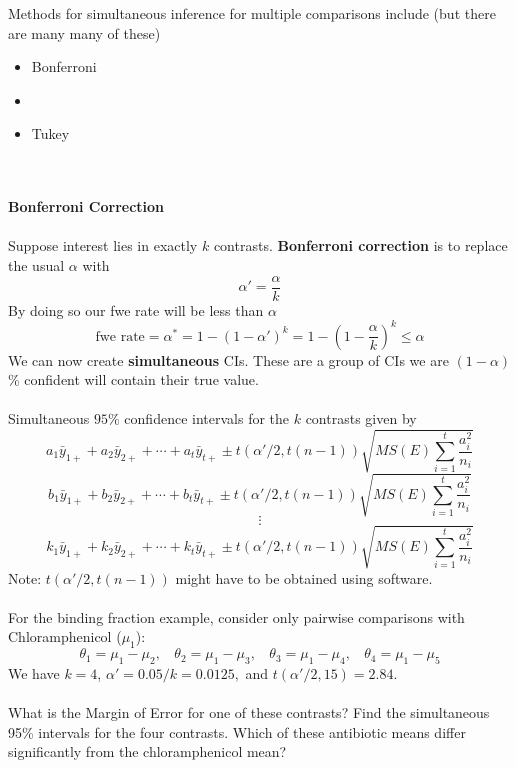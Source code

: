 Methods for simultaneous inference for multiple comparisons include (but there are many many of these)
\begin{itemize}
\item Bonferroni
\item \chef
\item Tukey
\end{itemize}

~\\~\\
\textbf{Bonferroni Correction}\\~\\
Suppose interest lies in exactly $k$ contrasts.  \textbf{Bonferroni correction} is to replace the usual $\alpha$ with
$$ \alpha'=\frac{\alpha}{k} $$
By doing so our fwe rate will be less than $\alpha$
$$\mbox{fwe rate}=\alpha^{*}=1-(1-\alpha')^{k}=1-(1-\frac{\alpha}{k})^{k}\leq \alpha$$
We can now create \textbf{simultaneous} CIs.  These are a group of CIs we are $(1-\alpha)$\% confident will  contain their true value.\\~\\
Simultaneous $95\%$ confidence intervals for the $k$ contrasts given by
$$ a_1 \bar{y}_{1+} + a_2 \bar{y}_{2+} + \cdots + a_t \bar{y}_{t+} \pm t(\alpha'/2,t(n-1))\sqrt{MS(E) \sum_{i=1}^{t} \frac{a_i^2}{n_i}} $$
$$ b_1 \bar{y}_{1+} + b_2 \bar{y}_{2+} + \cdots + b_t \bar{y}_{t+} \pm t(\alpha'/2,t(n-1))\sqrt{MS(E) \sum_{i=1}^{t} \frac{a_i^2}{n_i}} $$
$$\vdots$$ 
$$ k_1 \bar{y}_{1+} + k_2 \bar{y}_{2+} + \cdots + k_t \bar{y}_{t+} \pm t(\alpha'/2,t(n-1))\sqrt{MS(E) \sum_{i=1}^{t} \frac{a_i^2}{n_i}} $$
Note: $t(\alpha'/2,t(n-1))$ might have to be obtained using software.\\~\\

For the binding fraction example, consider only pairwise comparisons with Chloramphenicol ($\mu_1$):
$$\theta_1 = \mu_1-\mu_2, ~~~~\theta_2 = \mu_1-\mu_3, ~~~~\theta_3 = \mu_1-\mu_4, ~~~~\theta_4 = \mu_1-\mu_5$$
We have $k=4$, $ \alpha'=0.05/k=0.0125,$ and $t(\alpha'/2,15) = 2.84$.\\~\\
What is the Margin of Error for one of these contrasts?  Find the simultaneous 95\% intervals for the four contrasts.  Which of these antibiotic means differ significantly from the chloramphenicol mean?\\
\color{black}
\newpage

